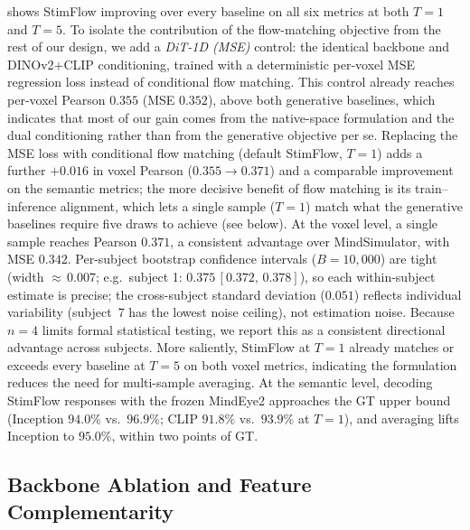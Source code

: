 \documentclass[runningheads]{llncs}
\begin{document}
 shows StimFlow improving over every baseline on all six metrics at both
$T{=}1$ and $T{=}5$.
To isolate the contribution of the flow-matching objective from the rest of our design,
we add a \emph{DiT-1D (MSE)} control: the identical backbone and DINOv2$+$CLIP conditioning,
trained with a deterministic per-voxel MSE regression loss instead of conditional flow
matching. This control already reaches per-voxel Pearson $0.355$ (MSE $0.352$), above both
generative baselines, which indicates that most of our gain comes from the native-space
formulation and the dual conditioning rather than from the generative objective per se.
Replacing the MSE loss with conditional flow matching (default StimFlow, $T{=}1$) adds a
further $+0.016$ in voxel Pearson ($0.355{\rightarrow}0.371$) and a comparable improvement
on the semantic metrics; the more decisive benefit of flow matching is its
train--inference alignment, which lets a single sample ($T{=}1$) match what the generative
baselines require five draws to achieve (see below).
At the voxel level, a single sample reaches Pearson $0.371$, a consistent advantage
over MindSimulator, with MSE $0.342$.
Per-subject bootstrap confidence intervals ($B{=}10{,}000$) are tight (width ${\approx}\,0.007$;
e.g.\ subject 1: $0.375\,[0.372,\,0.378]$), so each within-subject estimate is precise;
the cross-subject standard deviation ($0.051$) reflects individual variability (subject~7
has the lowest noise ceiling), not estimation noise. Because $n=4$ limits formal
statistical testing, we report this as a consistent directional advantage across subjects.
More saliently, StimFlow at $T{=}1$ already matches or exceeds every baseline at $T{=}5$ on both
voxel metrics, indicating the formulation reduces the need for multi-sample averaging.
At the semantic level, decoding StimFlow responses with the frozen MindEye2 approaches the GT
upper bound (Inception $94.0\%$ vs.\ $96.9\%$; CLIP $91.8\%$ vs.\ $93.9\%$ at $T{=}1$), and
averaging lifts Inception to $95.0\%$, within two points of GT.

\subsection{Backbone Ablation and Feature Complementarity}
\label{sec:exp-abl}
\end{document}
